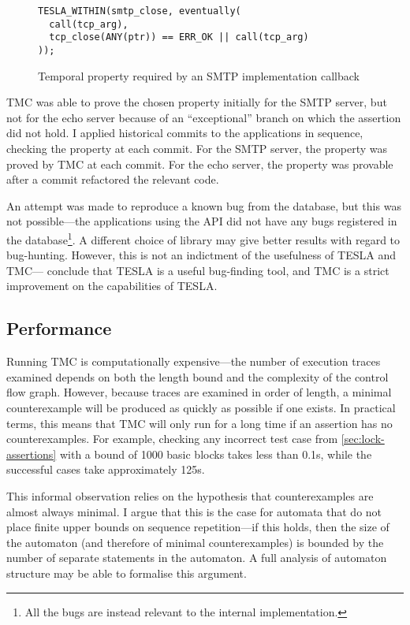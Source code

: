 \begin{figure}
  \begin{verbatim}
TESLA_WITHIN(smtp_close, eventually(
  call(tcp_arg),
  tcp_close(ANY(ptr)) == ERR_OK || call(tcp_arg)  
));
  \end{verbatim}
  \caption{Temporal property required by an SMTP implementation
  callback}
  \label{lst:argclose}
\end{figure}

TMC was able to prove the chosen property initially for the SMTP server,
but not for the echo server because of an ``exceptional'' branch on
which the assertion did not hold. I applied historical commits to the
applications in sequence, checking the property at each commit. For the
SMTP server, the property was proved by TMC at each commit. For the echo
server, the property was provable after a commit refactored the relevant
code.

An attempt was made to reproduce a known bug from the \lwip{} database,
but this was not possible---the applications using the \lwip{} API did
not have any bugs registered in the database\footnote{All the bugs are
instead relevant to the internal implementation.}. A different choice of
library may give better results with regard to bug-hunting. However,
this is not an indictment of the usefulness of TESLA and
TMC---\textcite{anderson_tesla:_2014} conclude that TESLA is a useful
bug-finding tool, and TMC is a strict improvement on the capabilities of
TESLA.

\subsection{Performance}

Running TMC is computationally expensive---the number of execution traces
examined depends on both the length bound and the complexity of the control flow
graph. However, because traces are examined in order of length, a minimal
counterexample will be produced as quickly as possible if one exists. In
practical terms, this means that TMC will only run for a long time if an
assertion has no counterexamples. For example, checking any incorrect test case
from \autoref{sec:lock-assertions} with a bound of \num{1000} basic blocks takes
less than \num{0.1}\si{\second}, while the successful cases take approximately
\num{125}\si{\second}.

This informal observation relies on the hypothesis that counterexamples are
almost always minimal. I argue that this is the case for automata that do not
place finite upper bounds on sequence repetition---if this holds, then the size
of the automaton (and therefore of minimal counterexamples) is bounded by the
number of separate statements in the automaton. A full analysis of automaton
structure may be able to formalise this argument.

